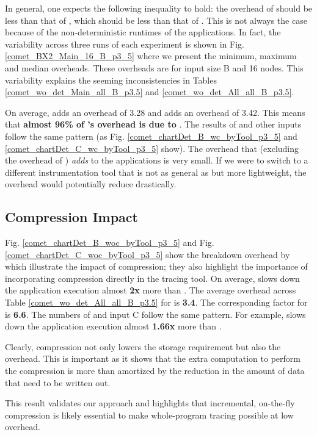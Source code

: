 




In general, one 
expects the following inequality to hold:
 the overhead of \pininit should be less than that of \parlot
, which should be less than that of \parlotnc. 
%
This is not always the case because of the non-deterministic runtimes of the applications.
%
In fact, the variability across three runs of each experiment
is shown in Fig. \ref{comet_BX2_Main_16_B_p3_5}
where we present the minimum, maximum and median overheads.
%
These
overheads are for input size B and 16 nodes. 
%
This variability explains the seeming inconsistencies in  Tables
\ref{comet_wo_det_Main_all_B_p3.5} and
\ref{comet_wo_det_All_all_B_p3.5}.


On average, \pininit adds
an overhead of 3.28  and \parlota adds an overhead of 3.42. 
%
This means that \textbf{almost 96\%
of \parlota's overhead is due to \pin}. 
%
The results of \parlotm and
other inputs follow the same pattern
(as Fig. \ref{comet_chartDet_B_wc_byTool_p3_5} and \ref{comet_chartDet_C_wc_byTool_p3_5} show). 
%
The overhead that \parlot (excluding the overhead of \pininit) {\em adds}
to the applications is very small.
%
If we were to switch to a different
instrumentation tool that is not as general as \pin but more
lightweight, the overhead would potentially reduce drastically. \\


\subsection{Compression Impact} 
\label{subsec:compact}

Fig. \ref{comet_chartDet_B_woc_byTool_p3_5} and Fig. \ref{comet_chartDet_C_woc_byTool_p3_5} show the breakdown overhead by \parlotnc which illustrate the impact of compression; they also highlight the importance of incorporating compression directly in the tracing tool. 
%
On average, \parlotnc slows down the application execution almost \textbf{2x} more than \parlota. 
%
The average overhead 
across Table \ref{comet_wo_det_All_all_B_p3.5} for \parlota is \textbf{3.4}.
%
The  corresponding factor for \parlotnc is \textbf{6.6}. 
%
The numbers of \parlotm and input C  follow the same pattern. For example, \parlotnc slows down the application execution almost \textbf{1.66x} more than \parlotm.
%

Clearly, compression not only lowers the storage requirement but also the overhead. This is important as it shows that the extra computation to perform the compression is more than amortized by the reduction in the amount of data that need to be written out.
%

This result validates our approach and highlights that incremental, on-the-fly compression is likely essential to make whole-program tracing possible at low overhead.